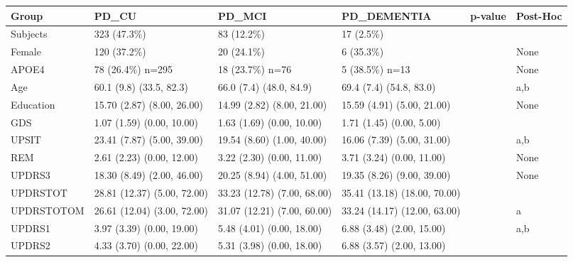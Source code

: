 \documentclass[1pt]{article}
\begin{document}
\begin{landscape} 


\begin{tabular}{llllll}
	\toprule
	Group &                              PD\_CU &                             PD\_MCI &                        PD\_DEMENTIA & p-value & Post-Hoc \\
	\midrule
	Subjects &                        323 (47.3\%) &                         83 (12.2\%) &                          17 (2.5\%) &         &          \\
	Female &                        120 (37.2\%) &                         20 (24.1\%) &                          6 (35.3\%) &         &     None \\
	APOE4 &                   78 (26.4\%) n=295 &                    18 (23.7\%) n=76 &                     5 (38.5\%) n=13 &         &     None \\
	Age &            60.1 (9.8) (33.5, 82.3) &            66.0 (7.4) (48.0, 84.9) &            69.4 (7.4) (54.8, 83.0) &         &      a,b \\
	Education &         15.70 (2.87) (8.00, 26.00) &         14.99 (2.82) (8.00, 21.00) &         15.59 (4.91) (5.00, 21.00) &         &     None \\
	GDS &          1.07 (1.59) (0.00, 10.00) &          1.63 (1.69) (0.00, 10.00) &           1.71 (1.45) (0.00, 5.00) &         &          \\
	UPSIT &         23.41 (7.87) (5.00, 39.00) &         19.54 (8.60) (1.00, 40.00) &         16.06 (7.39) (5.00, 31.00) &         &      a,b \\
	REM &          2.61 (2.23) (0.00, 12.00) &          3.22 (2.30) (0.00, 11.00) &          3.71 (3.24) (0.00, 11.00) &         &     None \\
	UPDRS3 &         18.30 (8.49) (2.00, 46.00) &         20.25 (8.94) (4.00, 51.00) &         19.35 (8.26) (9.00, 39.00) &         &     None \\
	UPDRSTOT &        28.81 (12.37) (5.00, 72.00) &        33.23 (12.78) (7.00, 68.00) &       35.41 (13.18) (18.00, 70.00) &         &          \\
	UPDRSTOTOM &        26.61 (12.04) (3.00, 72.00) &        31.07 (12.21) (7.00, 60.00) &       33.24 (14.17) (12.00, 63.00) &         &        a \\
	UPDRS1 &          3.97 (3.39) (0.00, 19.00) &          5.48 (4.01) (0.00, 18.00) &          6.88 (3.48) (2.00, 15.00) &         &      a,b \\
	UPDRS2 &          4.33 (3.70) (0.00, 22.00) &          5.31 (3.98) (0.00, 18.00) &          6.88 (3.57) (2.00, 13.00) &         &          \\

\end{tabular}
\end{landscape}
\end{document}
